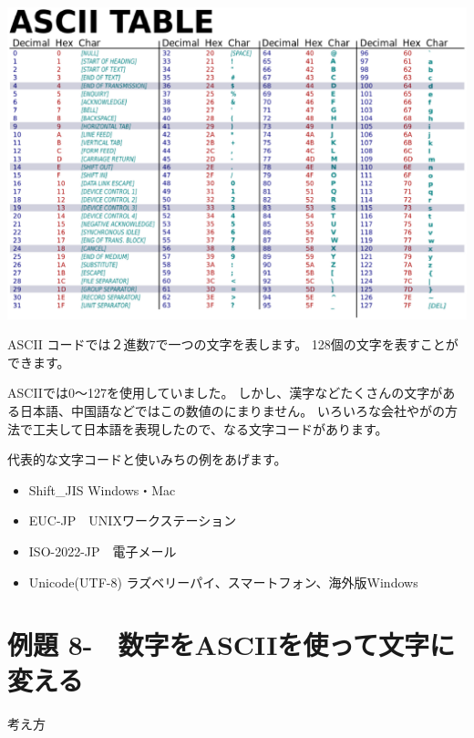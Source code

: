 \documentclass[a4paper,12pt,dvipdfmx]{jarticle}
\newcounter{Exercise}
\renewcommand\theExercise{例題 8-\arabic{Exercise}}
\begin{document}
\begin{center}
\includegraphics[width=17.006cm]{textbook-img016.eps}

\end{center}
ASCII
コードでは２進数7で一つの文字を表します。
128個の文字を表すことができます。


\bigskip


\bigskip


\bigskip

\clearpage
ASCIIでは0〜127を使用していました。
しかし、漢字などたくさんの文字がある日本語、中国語などではこの数値のにまりません。
いろいろな会社やがの方法で工夫して日本語を表現したので、なる文字コードがあります。

代表的な文字コードと使いみちの例をあげます。

\begin{itemize}
\item Shift\_JIS Windows・Mac
\item EUC-JP　UNIXワークステーション
\item ISO-2022-JP　電子メール
\item Unicode(UTF-8)
ラズベリーパイ、スマートフォン、海外版Windows


\bigskip
\end{itemize}

\bigskip
{}
\clearpage\section{\theExercise　数字をASCIIを使って文字に変える}
考え方
\end{document}
